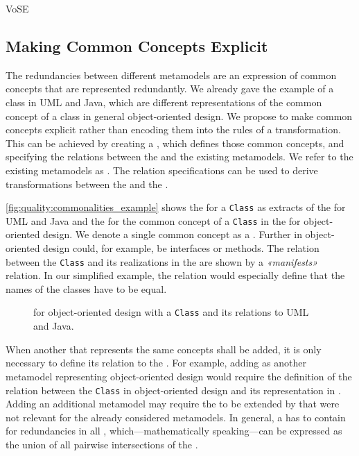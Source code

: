 \begin{copiedFrom}{VoSE}
\subsection*{Making Common Concepts Explicit}

The redundancies between different metamodels are an expression of common concepts that are represented redundantly.
We already gave the example of a class in UML and Java, which are different representations of the common concept of a class in general object-oriented design.
We propose to make common concepts explicit rather than encoding them into the rules of a transformation.
This can be achieved by creating a \emph{\conceptmetamodel}, which defines those common concepts, and specifying the relations between the \conceptmetamodel and the existing metamodels.
We refer to the existing metamodels as \emph{\concretemetamodels}.
The relation specifications can be used to derive transformations between the \concretemetamodels and the \conceptmetamodel.

\autoref{fig:quality:commonalities_example} shows the \metaclasses for a \texttt{Class} as extracts of the \concretemetamodels for UML and Java and the \metaclass for the common concept of a \texttt{Class} in the \conceptmetamodel for object-oriented design.
We denote a single common concept as a \emph{\commonality}.
Further \commonalities in object-oriented design could, for example, be interfaces or methods.
The relation between the \texttt{Class} \commonality and its realizations in the \concretemetamodels are shown by a \emph{«manifests»} relation.
In our simplified example, the relation would especially define that the names of the classes have to be equal. %

\begin{figure}
    \centering
    
    \caption[Concept metamodel for object-oriented design]{\Conceptmetamodel for object-oriented design with a \texttt{Class} \commonality and its relations to UML and Java.}
    \label{fig:quality:commonalities_example}
\end{figure}

When another \concretemetamodel that represents the same concepts shall be added, it is only necessary to define its relation to the \conceptmetamodel.
For example, adding \cplusplus as another metamodel representing object-oriented design would require the definition of the relation between the \texttt{Class} \commonality in object-oriented design and its representation in \cplusplus.
Adding an additional metamodel may require the \conceptmetamodel to be extended by \commonalities that were not relevant for the already considered metamodels.
In general, a \conceptmetamodel has to contain \commonalities for redundancies in all \concretemetamodels, which---mathematically speaking---can be expressed as the union of all pairwise intersections of the \concretemetamodels.


\end{copiedFrom}
